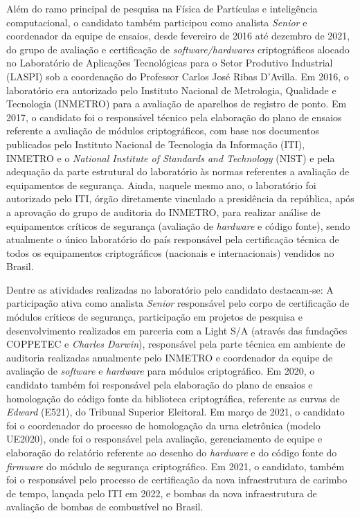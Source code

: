 Além do ramo principal de pesquisa na Física de Partículas e inteligência computacional, o candidato 
também participou como analista \emph{Senior} e coordenador da equipe de ensaios, desde fevereiro de 
2016 até dezembro de 2021, do grupo de avaliação e certificação 
de \emph{software/hardwares} criptográficos alocado no Laboratório de Aplicações Tecnológicas para 
o Setor Produtivo Industrial (LASPI) sob a coordenação do Professor Carlos José Ribas D'Avilla.
Em 2016, o laboratório era autorizado pelo Instituto Nacional de Metrologia, Qualidade e Tecnologia (INMETRO) 
para a avaliação de aparelhos de registro de ponto. 
Em 2017, o candidato foi o responsável técnico pela elaboração do plano de ensaios referente a avaliação 
de módulos criptográficos, com base nos documentos publicados pelo Instituto Nacional de Tecnologia 
da Informação (ITI), INMETRO e o \emph{National Institute of Standards and Technology} (NIST) e pela adequação 
da parte estrutural do laboratório às normas referentes a avaliação de equipamentos de segurança. 
Ainda, naquele mesmo ano, o laboratório foi autorizado pelo ITI, órgão diretamente vinculado a presidência 
da república, após a aprovação do grupo de auditoria do INMETRO, para realizar análise de equipamentos críticos 
de segurança (avaliação de \emph{hardware} e código fonte), sendo atualmente o único laboratório do país 
responsável pela certificação técnica de todos os equipamentos criptográficos (nacionais e internacionais) 
vendidos no Brasil. 

Dentre as atividades realizadas no laboratório pelo candidato destacam-se: A participação ativa como 
analista \emph{Senior} responsável pelo corpo de certificação de módulos críticos de segurança, participação 
em projetos de pesquisa e desenvolvimento realizados em parceria com a Light S/A (através das fundações 
COPPETEC e \emph{Charles Darwin}), responsável pela parte técnica em ambiente de auditoria realizadas anualmente 
pelo INMETRO e coordenador da equipe de avaliação de \emph{software} e \emph{hardware} para módulos criptográfico. 
Em 2020, o candidato também foi responsável pela elaboração do plano de ensaios e homologação 
do código fonte da biblioteca criptográfica, referente as curvas de \emph{Edward} (E521), do Tribunal Superior 
Eleitoral. Em março de 2021, o candidato foi o coordenador do processo de homologação da urna 
eletrônica (modelo UE2020), onde foi o responsável pela avaliação, gerenciamento de equipe e elaboração do relatório referente 
ao desenho do \emph{hardware} e do código fonte do \emph{firmware} do módulo de segurança criptográfico. Em 2021, o 
candidato, também foi o responsável pelo processo de certificação da nova infraestrutura 
de carimbo de tempo, lançada pelo ITI em 2022, e bombas da nova infraestrutura de avaliação de bombas de 
combustível no Brasil.








